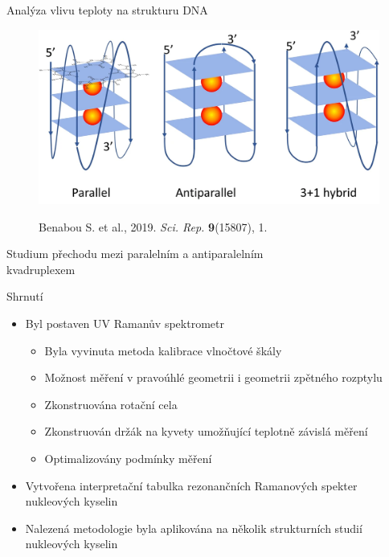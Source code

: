 \documentclass{beamer}
\begin{document}
\begin{frame}{Analýza vlivu teploty na strukturu DNA}
\begin{figure}
	\centering
	\includegraphics[width=1\columnwidth]{tel22/quadruplex_forms}\\
	\caption*{
		Benabou S. et al., 2019.
		\emph{Sci. Rep.}
		\textbf{9}(15807), 1.
	}
\end{figure}
\end{frame}

\begin{frame}{Studium přechodu mezi paralelním a antiparalelním\\ kvadruplexem}
\begin{center}
	\resizebox{1\columnwidth}{!}{}
\end{center}
\end{frame}


%

\begin{frame}{Shrnutí}
\begin{itemize}
	\item Byl postaven UV Ramanův spektrometr
	\begin{itemize}
		\item Byla vyvinuta metoda kalibrace vlnočtové škály
		\item Možnost měření v pravoúhlé geometrii i geometrii zpětného rozptylu
		\item Zkonstruována rotační cela
		\item Zkonstruován držák na kyvety umožňující teplotně závislá měření
		\item Optimalizovány podmínky měření
	\end{itemize}
	\item Vytvořena interpretační tabulka rezonančních Ramanových spekter
		nukleových kyselin
	\item Nalezená metodologie byla aplikována na několik strukturních studií
		nukleových kyselin
\end{itemize}
\end{frame}
\end{document}
